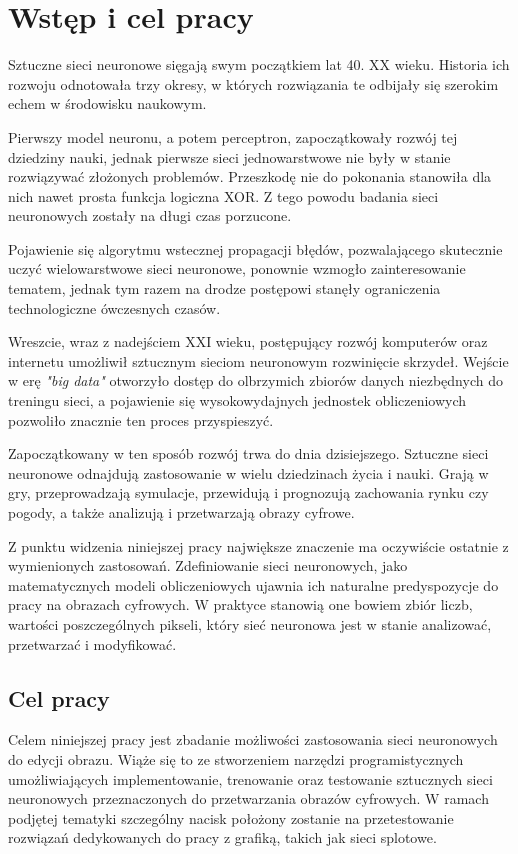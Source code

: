 \section{Wstęp i cel pracy}

  Sztuczne sieci neuronowe sięgają swym początkiem lat 40. XX wieku.
  Historia ich rozwoju odnotowała trzy okresy, w których rozwiązania te
  odbijały się szerokim echem w środowisku naukowym.

  Pierwszy model neuronu, a potem perceptron, zapoczątkowały
  rozwój tej dziedziny nauki, jednak pierwsze sieci jednowarstwowe nie były w
  stanie rozwiązywać złożonych problemów. Przeszkodę nie do pokonania stanowiła
  dla nich nawet prosta funkcja logiczna XOR. Z tego powodu badania sieci
  neuronowych zostały na długi czas porzucone.

  Pojawienie się algorytmu wstecznej propagacji błędów,
  pozwalającego skutecznie uczyć wielowarstwowe sieci neuronowe, ponownie
  wzmogło zainteresowanie tematem, jednak tym razem na drodze postępowi stanęły
  ograniczenia technologiczne ówczesnych czasów.

  Wreszcie, wraz z nadejściem XXI wieku, postępujący rozwój
  komputerów oraz internetu umożliwił sztucznym sieciom neuronowym rozwinięcie
  skrzydeł. Wejście w erę \textit{"big data"} otworzyło dostęp do olbrzymich zbiorów
  danych niezbędnych do treningu sieci, a pojawienie się wysokowydajnych
  jednostek obliczeniowych pozwoliło znacznie ten proces przyspieszyć.

  Zapoczątkowany w ten sposób rozwój trwa do dnia dzisiejszego.
  Sztuczne sieci neuronowe odnajdują zastosowanie w wielu dziedzinach życia i
  nauki. Grają w gry, przeprowadzają symulacje, przewidują i prognozują
  zachowania rynku czy pogody, a także analizują i przetwarzają obrazy cyfrowe.

  Z punktu widzenia niniejszej pracy największe znaczenie ma
  oczywiście ostatnie z wymienionych zastosowań. Zdefiniowanie sieci neuronowych,
  jako matematycznych modeli obliczeniowych ujawnia ich naturalne predyspozycje
  do pracy na obrazach cyfrowych. W praktyce stanowią one bowiem zbiór liczb,
  wartości poszczególnych pikseli, który sieć neuronowa jest w stanie
  analizować, przetwarzać i modyfikować.

  \subsection{Cel pracy}

    Celem niniejszej pracy jest zbadanie możliwości zastosowania sieci neuronowych
    do edycji obrazu. Wiąże się to ze stworzeniem narzędzi programistycznych
    umożliwiających implementowanie, trenowanie oraz testowanie sztucznych sieci
    neuronowych przeznaczonych do przetwarzania
    obrazów cyfrowych. W ramach podjętej tematyki szczególny nacisk położony
    zostanie na przetestowanie rozwiązań dedykowanych do pracy z grafiką, takich jak
    sieci splotowe.


